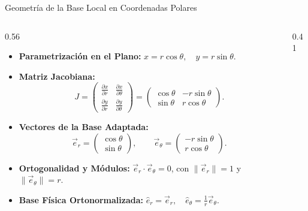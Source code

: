 \documentclass[10pt,aspectratio=169]{beamer}
\begin{document}
\begin{frame}{Geometría de la Base Local en Coordenadas Polares}
  \begin{columns}[c]
    \begin{column}{0.56\textwidth}
      \footnotesize
      \begin{itemize}\itemsep2pt
        \item \textbf{Parametrización en el Plano:}
        $x = r\cos\theta, \quad y = r\sin\theta$.
        \item \textbf{Matriz Jacobiana:}
        \[
        J = \begin{pmatrix} \frac{\partial x}{\partial r} & \frac{\partial x}{\partial\theta} \\ \frac{\partial y}{\partial r} & \frac{\partial y}{\partial\theta} \end{pmatrix} = \begin{pmatrix} \cos\theta & -r\sin\theta \\ \sin\theta & r\cos\theta \end{pmatrix}.
        \]
        \item \textbf{Vectores de la Base Adaptada:}
        \[
        \vec{e}_r = \begin{pmatrix} \cos\theta \\ \sin\theta \end{pmatrix}, \qquad
        \vec{e}_\theta = \begin{pmatrix} -r\sin\theta \\ r\cos\theta \end{pmatrix}.
        \]
        \item \textbf{Ortogonalidad y Módulos:}
        $\vec{e}_r \cdot \vec{e}_\theta = 0$, con $\|\vec{e}_r\| = 1$ y $\|\vec{e}_\theta\| = r$.
        \item \textbf{Base Física Ortonormalizada:}
        $\hat{e}_r = \vec{e}_r, \quad \hat{e}_\theta = \frac{1}{r}\vec{e}_\theta$.
      \end{itemize}
    \end{column}
    \begin{column}{0.41\textwidth}
      \centering
\end{column}
\end{columns}
\end{frame}
\end{document}
